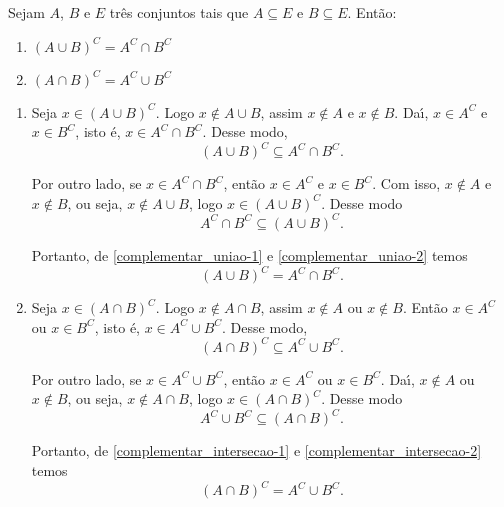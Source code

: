 \begin{proposicao} Sejam $A$, $B$ e $E$ tr{\^e}s conjuntos tais que $A\subseteq E$ e $B\subseteq E$. Ent{\~a}o:
\begin{enumerate}[label={\roman*})]
	\item $(A\cup B)^C = A^C\cap B^C$
	\item $(A\cap B)^C = A^C\cup B^C$
\end{enumerate}
\end{proposicao}
\begin{prova}
	\begin{enumerate}[label={\roman*})]
		\item Seja $x \in (A\cup B)^C$. Logo $x\notin A\cup B$, assim $x\notin A$ e $x\notin B$. Da{\'\i}, $x\in A^C$ e $x\in B^C$, isto {\'e}, $x\in A^C\cap B^C$. Desse modo,
		\begin{equation}\label{complementar_uniao-1}
			(A\cup B)^C \subseteq A^C\cap B^C.
		\end{equation}

		Por outro lado, se $x\in A^C\cap B^C$, ent{\~a}o $x\in A^C$ e $x\in B^C$. Com isso, $x\notin A$ e $x\notin B$, ou seja, $x\notin A\cup B$, logo $x\in (A\cup B)^C$. Desse modo
		\begin{equation}\label{complementar_uniao-2}
			A^C\cap B^C\subseteq(A\cup B)^C.
		\end{equation}

		Portanto, de \eqref{complementar_uniao-1} e \eqref{complementar_uniao-2} temos
		\[
			(A\cup B)^C = A^C\cap B^C.
		\]

		\item Seja $x \in (A\cap B)^C$. Logo $x\notin A\cap B$, assim $x\notin A$ ou $x\notin B$. Ent\~ao $x\in A^C$ ou $x\in B^C$, isto {\'e}, $x\in A^C\cup B^C$. Desse modo,
		\begin{equation}\label{complementar_intersecao-1}
			(A\cap B)^C \subseteq A^C\cup B^C.
		\end{equation}

		Por outro lado, se $x\in A^C\cup B^C$, ent{\~a}o $x\in A^C$ ou $x\in B^C$. Da{\'\i}, $x\notin A$ ou $x\notin B$, ou seja, $x\notin A\cap B$, logo $x\in (A\cap B)^C$. Desse modo
		\begin{equation}\label{complementar_intersecao-2}
			A^C\cup B^C\subseteq(A\cap B)^C.
		\end{equation}

		Portanto, de \eqref{complementar_intersecao-1} e \eqref{complementar_intersecao-2} temos
		\[
			(A\cap B)^C = A^C\cup B^C.
		\]
	\end{enumerate}
\end{prova}

